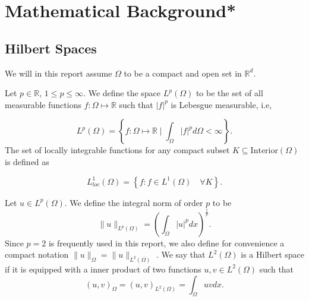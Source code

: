 
\newpage
\section{Mathematical Background*}%
\label{sec:background_}

\subsection{Hilbert Spaces}%
\label{ssub:hilbert_spaces}

We will in this report assume $\Omega $ to be a compact and open set in $\mathbb{R} ^{d}$.

\begin{definition}
Let $p \in \mathbb{R} $, $ 1 \le  p \le  \infty$. We define the space $L^{p}\left( \Omega  \right) $ to be the set of all measurable functions $f: \Omega  \mapsto \mathbb{R} $ such that
$\left\lvert f \right\rvert ^{p}$ is Lebesgue measurable, i.e,

\begin{equation*}
    L^{p}\left( \Omega  \right) = \left\{ f: \Omega \mapsto \mathbb{R}  \mid \int_{\Omega }^{} \left\lvert f \right\rvert ^{p} d \Omega  < \infty  \right\}
.\end{equation*}
The set of locally integrable functions for any compact subset $K \subseteq \text{Interior}\left( \Omega  \right) $ is defined as

\begin{equation*}
    L_{loc}^{1}\left( \Omega  \right)  = \left\{ f: f \in L^{1}\left( \Omega  \right)  \quad \forall K   \right\}.
\end{equation*}
\end{definition}


Let $u \in L^{p}\left( \Omega  \right) $. We define the integral norm of order $p$ to be \[
\| u \|_{ L^{p}\left( \Omega  \right)  }^{  }  = \left( \int_{\Omega }^{} \left\lvert u \right\rvert ^{p} dx  \right) ^{\frac{1}{p}}.
\]
Since $p=2$ is frequently used in this report, we also define for convenience a compact notation $\| u \|_{ \Omega  }^{  }  = \| u \|_{ L^{2}\left( \Omega  \right)  }^{  } $ .  We say that $L^{2}\left( \Omega  \right) $ is a Hilbert space if it is equipped with a inner
product of two functions $u,v \in L^{2}\left( \Omega  \right) $ such that
\[
\left( u,v \right) _{\Omega } = \left( u,v \right) _{L^2\left( \Omega  \right) } = \int_{\Omega }^{} u  v dx.
\]

